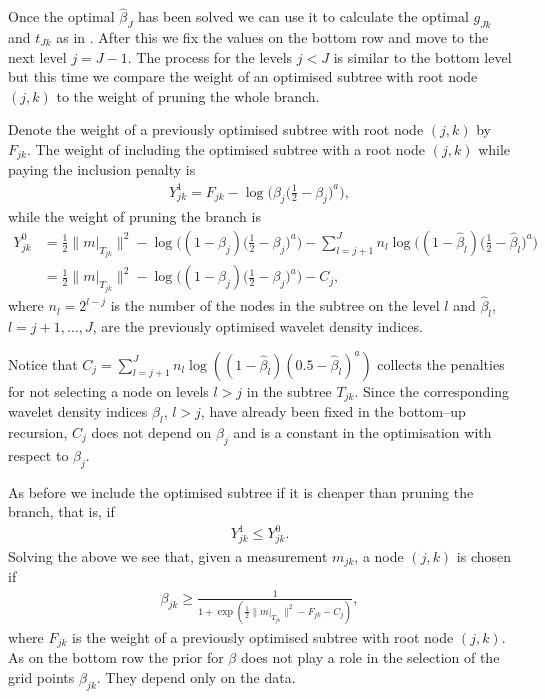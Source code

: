 \documentclass[11pt,a4paper]{article}
\begin{document}
Once the optimal $\hat{\beta}_J$ has been solved we can use it to calculate the optimal $g_{Jk}$ and $t_{Jk}$ as in \cite{Kekkonen2023}. After this we fix the values on the bottom row and move to the next level $j=J-1$. The process for the levels $j<J$ is similar to the bottom level but this time we compare the weight of an optimised subtree with root node $(j,k)$ to the weight of pruning the whole branch. 

Denote the weight of a previously optimised subtree with root node $(j,k)$ by $F_{jk}$. The weight of including the optimised subtree with a root node $(j,k)$ while paying the inclusion penalty is
\begin{align*}
Y^1_{jk}=F_{jk}-\log\bigg(\beta_j\Big(\frac{1}{2}-\beta_j\Big)^a\bigg),    
\end{align*}
while the weight of pruning the branch is 
\begin{align*}
Y^0_{jk} 
& = \frac{1}{2}\|m{|_{T_{jk}}}\|^2
-\log\bigg((1-\beta_j)\Big(\frac{1}{2}-\beta_j\Big)^a\bigg)
-\sum_{l=j+1}^J n_l \log\bigg((1-\hat{\beta}_l)\Big(\frac{1}{2}-\hat{\beta}_l\Big)^a\bigg)\\
& = \frac{1}{2}\|m{|_{T_{jk}}}\|^2
-\log\bigg((1-\beta_j)\Big(\frac{1}{2}-\beta_j\Big)^a\bigg)
-C_j,
\end{align*}
where $n_l=2^{l-j}$ is the number of the nodes in the subtree on the level $l$ and $\hat{\beta}_l$, $l=j+1,\dots,J$, are the previously optimised wavelet density indices. 

Notice that $C_j=\sum_{l=j+1}^J n_l \log((1-\hat{\beta}_l)(0.5-\hat{\beta}_l)^a)$ collects the penalties for not selecting a node on levels $l>j$ in the subtree $T_{jk}$. Since the corresponding wavelet density indices $\hat{\beta}_l$, $l>j$, have already been fixed in the bottom–up recursion, $C_j$ does not depend on $\beta_j$ and is a constant in the optimisation with respect to $\beta_j$.


As before we include the optimised subtree if it is cheaper than pruning the branch, that is, if
\begin{align*}
Y^1_{jk}\leq Y^0_{jk}.
\end{align*}
Solving the above we see that, given a measurement $m_{jk}$, a node $(j,k)$ is chosen if 
\begin{align*}
\beta_{jk}\geq \frac{1}{1+\exp(\frac{1}{2}\|m|_{T_{jk}}\|^2-F_{jk}-C_j)},
\end{align*}
where $F_{jk}$ is the weight of a previously optimised subtree with root node $(j,k)$. 
As on the bottom row the prior for $\beta$ does not play a role in the selection of the grid points $\beta_{jk}$. They depend only on the data. 
\end{document}
